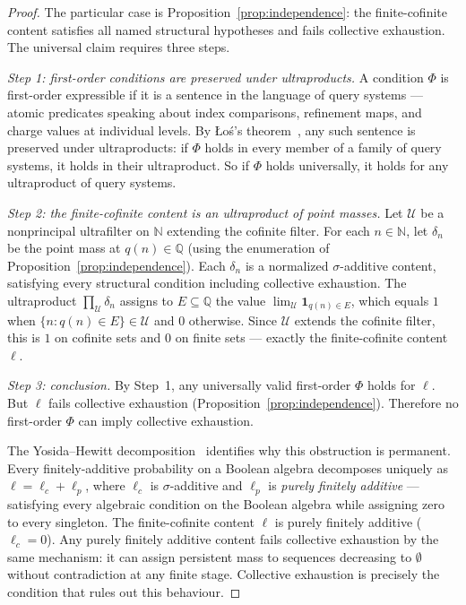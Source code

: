 \begin{proof}
The particular case is Proposition~\ref{prop:independence}: the finite-cofinite
content satisfies all named structural hypotheses and fails collective exhaustion.
The universal claim requires three steps.

\textit{Step 1: first-order conditions are preserved under ultraproducts.}
A condition $\Phi$ is first-order expressible if it is a sentence in the language
of query systems --- atomic predicates speaking about index comparisons, refinement
maps, and charge values at individual levels.  By \L o\'s's theorem~\cite{Los1955}, any such
sentence is preserved under ultraproducts: if $\Phi$ holds in every member of a
family of query systems, it holds in their ultraproduct.  So if $\Phi$ holds
universally, it holds for any ultraproduct of query systems.

\textit{Step 2: the finite-cofinite content is an ultraproduct of point masses.}
Let $\mathcal{U}$ be a nonprincipal ultrafilter on $\mathbb{N}$ extending the
cofinite filter.  For each $n \in \mathbb{N}$, let $\delta_n$ be the point mass
at $q(n) \in \mathbb{Q}$ (using the enumeration of
Proposition~\ref{prop:independence}).  Each $\delta_n$ is a normalized
$\sigma$-additive content, satisfying every structural condition including
collective exhaustion.  The ultraproduct $\prod_{\mathcal{U}} \delta_n$ assigns
to $E \subseteq \mathbb{Q}$ the value $\lim_{\mathcal{U}} \mathbf{1}_{q(n) \in E}$,
which equals $1$ when $\{n : q(n) \in E\} \in \mathcal{U}$ and $0$ otherwise.
Since $\mathcal{U}$ extends the cofinite filter, this is $1$ on cofinite sets and
$0$ on finite sets --- exactly the finite-cofinite content $\ell$.

\textit{Step 3: conclusion.}
By Step~1, any universally valid first-order $\Phi$ holds for $\ell$.  But $\ell$
fails collective exhaustion (Proposition~\ref{prop:independence}).  Therefore no
first-order $\Phi$ can imply collective exhaustion.

The Yosida--Hewitt decomposition~\cite{YosidaHewitt1952} identifies why this obstruction is permanent.
Every finitely-additive probability on a Boolean algebra decomposes uniquely as
$\ell = \ell_c + \ell_p$, where $\ell_c$ is $\sigma$-additive and $\ell_p$ is
\emph{purely finitely additive} --- satisfying every algebraic condition on the
Boolean algebra while assigning zero to every singleton.  The finite-cofinite
content $\ell$ is purely finitely additive ($\ell_c = 0$).  Any purely finitely
additive content fails collective exhaustion by the same mechanism: it can assign
persistent mass to sequences decreasing to $\emptyset$ without contradiction at
any finite stage.  Collective exhaustion is precisely the condition that rules
out this behaviour.
\end{proof}

